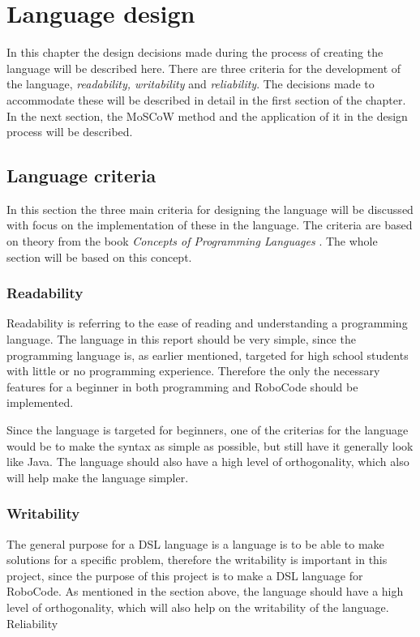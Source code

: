 \chapter{Language design}
\label{chap:LanguageDesign}
In this chapter the design decisions made during the process of creating the language will be described here. There are three criteria for the development of the language, \emph{readability, writability} and \emph{reliability}. The decisions made to accommodate these will be described in detail in the first section of the chapter. 
In the next section, the MoSCoW method and the application of it in the design process will be described. 
 
\section{Language criteria}
\label{sec:LanguageCriteria}
In this section the three main criteria for designing the language will be discussed with focus on the implementation of these in the language. The criteria are based on theory from the book \emph{Concepts of Programming Languages} \citep{Sebesta}. The whole section will be based on this concept.

\subsection{Readability}
Readability is referring to the ease of reading and understanding a programming language. The language in this report should be very simple, since the programming language is, as earlier mentioned, targeted for high school students with little or no programming experience. Therefore the only the necessary features for a beginner in both programming and RoboCode should be implemented. 

Since the language is targeted for beginners, one of the criterias for the language would be to make the syntax as simple as possible, but still have it generally look like Java. The language should also have a high level of orthogonality, which also will help make the language simpler. 

\subsection{Writability}
The general purpose for a DSL language is a language is to be able to make solutions for a specific problem, therefore the writability is important in this project, since the purpose of this project is to make a DSL language for RoboCode. As mentioned in the section above, the language should have a high level of orthogonality, which will also help on  the writability of the language. 
Reliability

